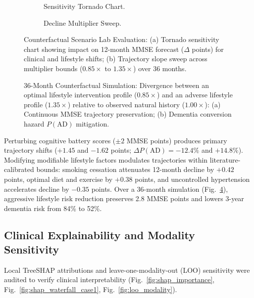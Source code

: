 \documentclass[11pt,a4paper]{article}
\begin{document}
\begin{figure}[t]
\centering
\begin{subfigure}[t]{0.48\linewidth}
    \centering
    \caption{Sensitivity Tornado Chart.}
    \label{fig:scenario_tornado}
\end{subfigure}
\hfill
\begin{subfigure}[t]{0.48\linewidth}
    \centering
    \caption{Decline Multiplier Sweep.}
    \label{fig:multiplier_sweep}
\end{subfigure}
\caption{Counterfactual Scenario Lab Evaluation: (a) Tornado sensitivity chart showing impact on 12-month MMSE forecast ($\Delta$ points) for clinical and lifestyle shifts; (b) Trajectory slope sweep across multiplier bounds ($0.85\times$ to $1.35\times$) over 36 months.}
\label{fig:scenario_analysis}
\end{figure}

\begin{figure}[t]
\centering
{}
\caption{36-Month Counterfactual Simulation: Divergence between an optimal lifestyle intervention profile ($0.85\times$) and an adverse lifestyle profile ($1.35\times$) relative to observed natural history ($1.00\times$): (a) Continuous MMSE trajectory preservation; (b) Dementia conversion hazard $P(\text{AD})$ mitigation.}
\label{fig:lifestyle_sweep}
\end{figure}

Perturbing cognitive battery scores ($\pm 2$ MMSE points) produces primary trajectory shifts ($+1.45$ and $-1.62$ points; $\Delta P(\text{AD}) = -12.4\%$ and $+14.8\%$). Modifying modifiable lifestyle factors modulates trajectories within literature-calibrated bounds: smoking cessation attenuates 12-month decline by $+0.42$ points, optimal diet and exercise by $+0.38$ points, and uncontrolled hypertension accelerates decline by $-0.35$ points. Over a 36-month simulation (Fig.~\ref{fig:lifestyle_sweep}), aggressive lifestyle risk reduction preserves 2.8 MMSE points and lowers 3-year dementia risk from 84\% to 52\%.

\subsection{Clinical Explainability and Modality Sensitivity}
\label{sec:results_explain}
Local TreeSHAP attributions and leave-one-modality-out (LOO) sensitivity were audited to verify clinical interpretability (Fig.~\ref{fig:shap_importance}, Fig.~\ref{fig:shap_waterfall_case1}, Fig.~\ref{fig:loo_modality}).
\end{document}
